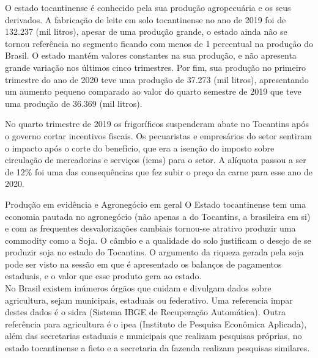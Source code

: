 \par O estado tocantinense é conhecido pela sua produção agropecuária e os seus derivados. A fabricação de leite em solo tocantinense no ano de 2019 foi de 132.237 (mil litros), apesar de uma produção grande, o estado ainda não se tornou referência no segmento ficando com menos de 1 percentual na produção do Brasil. O estado mantém valores constantes na sua produção, e não apresenta grande variação nos últimos cinco trimestres. Por fim, sua produção no primeiro trimestre do ano de 2020 teve uma produção de 37.273 (mil litros), apresentando um aumento pequeno comparado ao valor do quarto semestre de 2019 que teve uma produção de 36.369 (mil litros).



\par No quarto trimestre de 2019 os frigoríficos suspenderam abate no Tocantins após o governo cortar incentivos fiscais. Os pecuaristas e empresários do setor sentiram o impacto após o corte do benefício, que era a isenção do imposto sobre circulação de mercadorias e serviços (\acrshort{icms}) para o setor. A alíquota passou a ser de 12\% foi uma das consequências que fez subir o preço da carne para esse ano de 2020.

\begin{smbox}[label={labelbox},nameref={Agricultura}]{Produção em evidência e Agronegócio em geral}
	O Estado tocantinense tem uma economia pautada no agronegócio (não apenas a do Tocantins, a brasileira em si) e com as frequentes desvalorizações cambiais tornou-se atrativo produzir uma commodity como a Soja. O câmbio e a qualidade do solo justificam o desejo de se produzir soja no  estado do Tocantins. O argumento da riqueza gerada pela soja pode ser visto na sessão em que é apresentado os balanços de pagamentos estaduais, e o valor que esse produto gera ao estado.
\\
	No Brasil existem inúmeros órgãos que cuidam e divulgam dados sobre agricultura, sejam municipais, estaduais ou federativo. Uma referencia impar destes dados é o \acrshort{sidra} (Sistema IBGE de Recuperação Automática). Outra referência para agricultura é o \acrshort{ipea} (Instituto de Pesquisa Econômica Aplicada), além das secretarias estaduais e municipais que realizam pesquisas próprias, no estado tocantinense a \acrshort{fieto} e a secretaria da fazenda realizam pesquisas similares.
\end{smbox}

